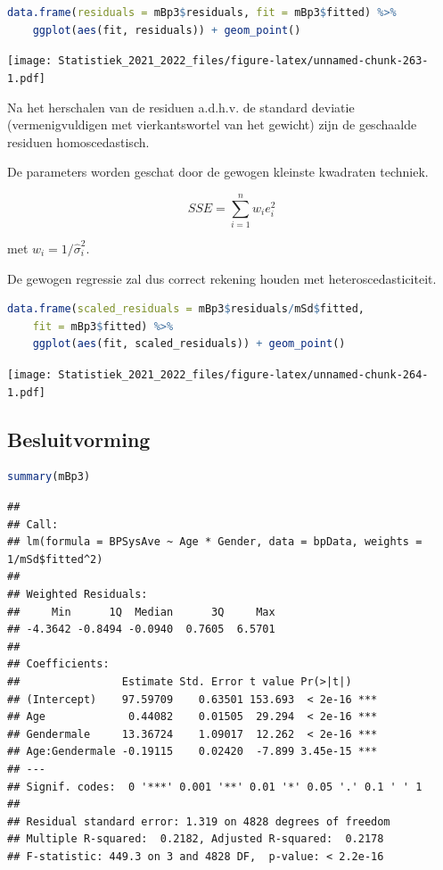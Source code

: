 \documentclass[
  12pt,dutch,coursenotes]{book}
\theoremstyle{definition}
\theoremstyle{definition}
\theoremstyle{definition}
\theoremstyle{definition}
\theoremstyle{remark}
\begin{document}
\begin{lstlisting}[language=R]
data.frame(residuals = mBp3$residuals, fit = mBp3$fitted) %>%
    ggplot(aes(fit, residuals)) + geom_point()
\end{lstlisting}

\texttt{[image: Statistiek\_2021\_2022\_files/figure-latex/unnamed-chunk-263-1.pdf]}

Na het herschalen van de residuen a.d.h.v. de standard deviatie (vermenigvuldigen met vierkantswortel van het gewicht) zijn de geschaalde residuen homoscedastisch.

De parameters worden geschat door de gewogen kleinste kwadraten techniek.

\[
SSE = \sum\limits_{i=1}^n w_i e_i^2
\]

met \(w_i = 1/\hat \sigma^2_i\).

De gewogen regressie zal dus correct rekening houden met heteroscedasticiteit.

\begin{lstlisting}[language=R]
data.frame(scaled_residuals = mBp3$residuals/mSd$fitted,
    fit = mBp3$fitted) %>%
    ggplot(aes(fit, scaled_residuals)) + geom_point()
\end{lstlisting}

\texttt{[image: Statistiek\_2021\_2022\_files/figure-latex/unnamed-chunk-264-1.pdf]}

\hypertarget{besluitvorming}{%
\subsection{Besluitvorming}\label{besluitvorming}}

\begin{lstlisting}[language=R]
summary(mBp3)
\end{lstlisting}

\begin{lstlisting}
## 
## Call:
## lm(formula = BPSysAve ~ Age * Gender, data = bpData, weights = 1/mSd$fitted^2)
## 
## Weighted Residuals:
##     Min      1Q  Median      3Q     Max 
## -4.3642 -0.8494 -0.0940  0.7605  6.5701 
## 
## Coefficients:
##                Estimate Std. Error t value Pr(>|t|)    
## (Intercept)    97.59709    0.63501 153.693  < 2e-16 ***
## Age             0.44082    0.01505  29.294  < 2e-16 ***
## Gendermale     13.36724    1.09017  12.262  < 2e-16 ***
## Age:Gendermale -0.19115    0.02420  -7.899 3.45e-15 ***
## ---
## Signif. codes:  0 '***' 0.001 '**' 0.01 '*' 0.05 '.' 0.1 ' ' 1
## 
## Residual standard error: 1.319 on 4828 degrees of freedom
## Multiple R-squared:  0.2182, Adjusted R-squared:  0.2178 
## F-statistic: 449.3 on 3 and 4828 DF,  p-value: < 2.2e-16
\end{lstlisting}
\end{document}
